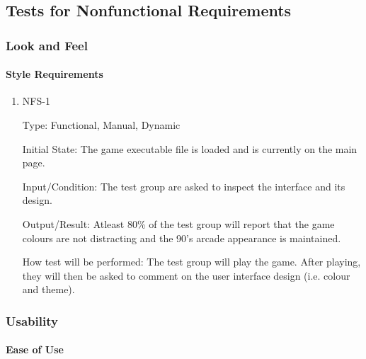 \documentclass[12pt, titlepage]{article}
\begin{document}
	
	\subsection{Tests for Nonfunctional Requirements}
	
	\subsubsection{Look and Feel}
	
	\paragraph{Style Requirements}
	
	\begin{enumerate}
		
		
		\item{NFS-1\\}
		
		Type: Functional, Manual, Dynamic 
		
		Initial State: The game executable file is loaded and is currently on the main page.
		
		Input/Condition: The test group are asked to inspect the interface and its design.
		
		Output/Result: Atleast 80\% of the test group will report that the game colours are not distracting and the 90's arcade appearance is maintained.
		
		How test will be performed: The test group will play the game. After playing, they will then be asked to comment on the user interface design (i.e. colour and theme).
		
	\end{enumerate}
	
	
	\subsubsection{Usability}
	
	\paragraph{Ease of Use}
	
\end{document}

